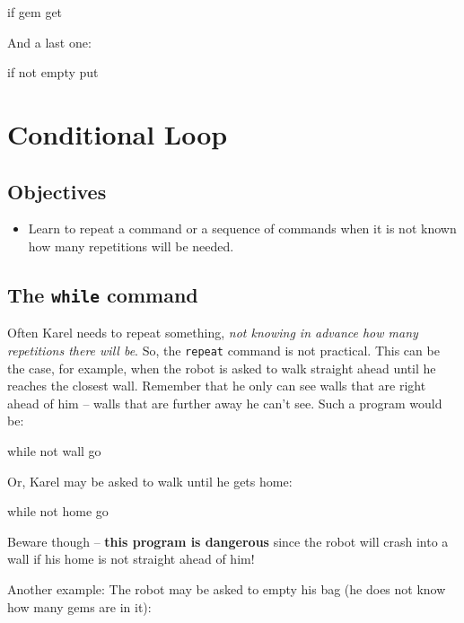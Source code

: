 \begin{bluecode}
if gem
    get
\end{bluecode}
And a last one:
 
\begin{bluecode}
if not empty
    put
\end{bluecode}


\section{Conditional Loop} \label{sec:whilek}

\subsection{Objectives} 
 
\begin{itemize}
\item Learn to repeat a command or a sequence of commands when it is not known 
      how many repetitions will be needed.
\end{itemize}

\subsection{The {\tt while} command}

Often Karel needs to repeat something, {\em not knowing in advance how many repetitions
there will be}. So, the {\tt repeat} command is not practical. This can be the case, for example, 
when the robot is asked to walk straight ahead until he reaches the closest wall.
Remember that he only can see walls that are right ahead of him -- walls 
that are further away he can't see. Such a program would be:

\begin{bluecode}
while not wall
    go
\end{bluecode}
Or, Karel may be asked to walk until he gets home:

\begin{bluecode}
while not home
    go
\end{bluecode}
Beware though -- {\bf this program is dangerous} since the robot will crash into a wall
if his home is not straight ahead of him!

Another example: The robot may be asked to empty his bag (he does not know how many gems are in it): 
 

